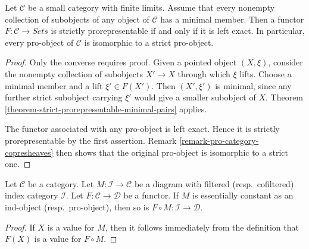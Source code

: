 \begin{proposition}
\label{corollary-artinian-left-exact-strict-prorepresentable}
Let $\mathcal{C}$ be a small category with finite limits. Assume that every
nonempty collection of subobjects of any object of $\mathcal{C}$ has a
minimal member. Then a functor
$F : \mathcal{C} \to \textit{Sets}$ is strictly prorepresentable if and
only if it is left exact. In particular, every pro-object of $\mathcal{C}$
is isomorphic to a strict pro-object.
\end{proposition}

\begin{proof}
Only the converse requires proof. Given a pointed object $(X, \xi)$,
consider the nonempty collection of subobjects $X' \to X$ through which
$\xi$ lifts. Choose a minimal member and a lift $\xi' \in F(X')$.
Then $(X', \xi')$ is minimal, since any further strict subobject carrying
$\xi'$ would give a smaller subobject of $X$. Theorem
\ref{theorem-strict-prorepresentable-minimal-pairs} applies.

The functor associated with any pro-object is left exact. Hence it is
strictly prorepresentable by the first assertion. Remark
\ref{remark-pro-category-copresheaves} then shows that the original
pro-object is isomorphic to a strict one.
\end{proof}

\begin{lemma}
\label{lemma-image-essentially-constant}
Let $\mathcal{C}$ be a category. Let $M : \mathcal{I} \to \mathcal{C}$
be a diagram with filtered (resp.\ cofiltered) index category $\mathcal{I}$.
Let $F : \mathcal{C} \to \mathcal{D}$ be a functor.
If $M$ is essentially constant as an ind-object (resp.\ pro-object),
then so is $F \circ M : \mathcal{I} \to \mathcal{D}$.
\end{lemma}

\begin{proof}
If $X$ is a value for $M$, then it follows immediately from the
definition that $F(X)$ is a value for $F \circ M$.
\end{proof}

